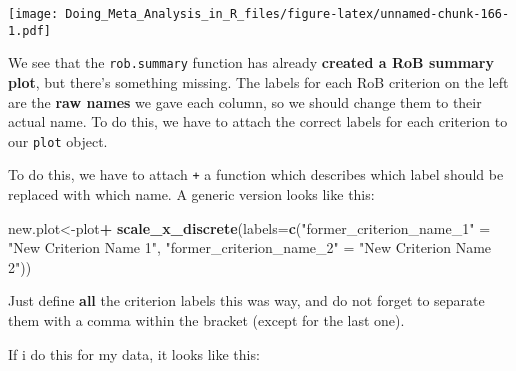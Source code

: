 \documentclass[]{book}
\newenvironment{Shaded}{\begin{snugshade}}{\end{snugshade}}
\newcommand{\KeywordTok}[1]{\textcolor[rgb]{0.13,0.29,0.53}{\textbf{#1}}}
\newcommand{\DataTypeTok}[1]{\textcolor[rgb]{0.13,0.29,0.53}{#1}}
\newcommand{\StringTok}[1]{\textcolor[rgb]{0.31,0.60,0.02}{#1}}
\newcommand{\OperatorTok}[1]{\textcolor[rgb]{0.81,0.36,0.00}{\textbf{#1}}}
\newcommand{\NormalTok}[1]{#1}
\theoremstyle{definition}
\theoremstyle{definition}
\theoremstyle{definition}
\theoremstyle{remark}
\begin{document}
\texttt{[image: Doing\_Meta\_Analysis\_in\_R\_files/figure-latex/unnamed-chunk-166-1.pdf]}

We see that the \texttt{rob.summary} function has already
\textbf{created a RoB summary plot}, but there's something missing. The
labels for each RoB criterion on the left are the \textbf{raw names} we
gave each column, so we should change them to their actual name. To do
this, we have to attach the correct labels for each criterion to our
\texttt{plot} object.

To do this, we have to attach \texttt{+} a function which describes
which label should be replaced with which name. A generic version looks
like this:

\begin{Shaded}
\begin{Highlighting}[]
\NormalTok{new.plot<-plot}\OperatorTok{+}
\StringTok{  }\KeywordTok{scale_x_discrete}\NormalTok{(}\DataTypeTok{labels=}\KeywordTok{c}\NormalTok{(}\StringTok{"former_criterion_name_1"}\NormalTok{ =}\StringTok{ "New Criterion Name 1"}\NormalTok{, }
                            \StringTok{"former_criterion_name_2"}\NormalTok{ =}\StringTok{ "New Criterion Name 2"}\NormalTok{))}
\end{Highlighting}
\end{Shaded}

Just define \textbf{all} the criterion labels this was way, and do not
forget to separate them with a comma within the bracket (except for the
last one).

If i do this for my data, it looks like this:
\end{document}
